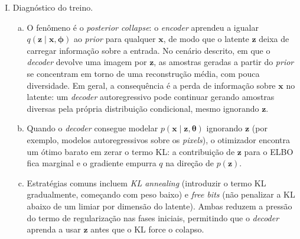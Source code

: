 \documentclass{dlproblemset}
\newcommand{\thetav}{\boldsymbol{\theta}}
\begin{document}
\begin{enumerate}[I)]
    \item Diagnóstico do treino.
    \begin{enumerate}[(a)]
        \item O fenômeno é o \emph{posterior collapse}: o \textit{encoder} aprendeu a igualar $q(\mathbf{z} \mid \mathbf{x}, \boldsymbol{\phi})$ ao \textit{prior} para qualquer $\mathbf{x}$, de modo que o latente $\mathbf{z}$ deixa de carregar informação sobre a entrada. No cenário descrito, em que o \textit{decoder} devolve uma imagem por $\mathbf{z}$, as amostras geradas a partir do \textit{prior} se concentram em torno de uma reconstrução média, com pouca diversidade. Em geral, a consequência é a perda de informação sobre $\mathbf{x}$ no latente: um \textit{decoder} autoregressivo pode continuar gerando amostras diversas pela própria distribuição condicional, mesmo ignorando $\mathbf{z}$.
        \item Quando o \textit{decoder} consegue modelar $p(\mathbf{x} \mid \mathbf{z}, \thetav)$ ignorando $\mathbf{z}$ (por exemplo, modelos autoregressivos sobre os \textit{pixels}), o otimizador encontra um ótimo barato em zerar o termo KL: a contribuição de $\mathbf{z}$ para o ELBO fica marginal e o gradiente empurra $q$ na direção de $p(\mathbf{z})$.
        \item Estratégias comuns incluem \textit{KL annealing} (introduzir o termo KL gradualmente, começando com peso baixo) e \textit{free bits} (não penalizar a KL abaixo de um limiar por dimensão do latente). Ambas reduzem a pressão do termo de regularização nas fases iniciais, permitindo que o \textit{decoder} aprenda a usar $\mathbf{z}$ antes que o KL force o colapso.
    \end{enumerate}



\end{enumerate}
\end{document}
